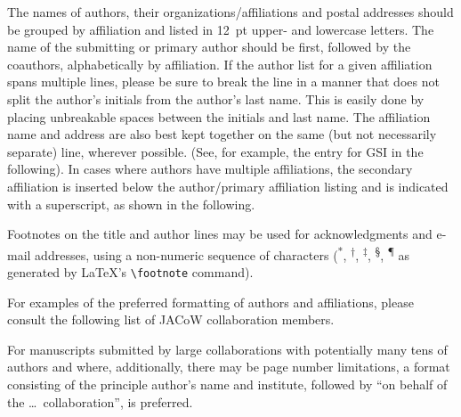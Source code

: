 %
%

\flushcolsend

The names of authors, their organizations/affiliations
and postal addresses should be grouped by affiliation and
listed in \SI{12}{pt} upper- and lowercase letters. The name of
the submitting or primary author should be first, followed
by the coauthors, alphabetically by affiliation. If the
author list for a given affiliation spans multiple lines,
please be sure to break the line in a manner that does not
split the author’s initials from the author’s last name. This
is easily done by placing unbreakable spaces between the
initials and last name. The affiliation name and address
are also best kept together on the same (but not necessarily
separate) line, wherever possible. (See, for example,
the entry for GSI in the following). In cases where authors
have multiple affiliations, the secondary affiliation is
inserted below the author/primary affiliation listing and is
indicated with a superscript, as shown in the following.


Footnotes on the title and author lines may be used for
acknowledgments and e-mail addresses, using a non-numeric
sequence of characters (\textsuperscript{*}, \textsuperscript{†},
\textsuperscript{‡}, \textsuperscript{§}, \textsuperscript{\P}
as generated by \LaTeX's \verb|\footnote| command).

For examples of the preferred formatting of authors and
affiliations, please consult the following list of JACoW
collaboration members.

For manuscripts submitted by large collaborations with
potentially many tens of authors and where, additionally,
there may be page number limitations, a format consisting
of the principle author’s name and institute, followed by
“on behalf of the \ldots\ collaboration”, is preferred.


\clearpage
%
%
{}

\clearpage


